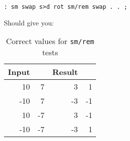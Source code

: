 \begin{lstlisting}[frame=lines]
        : sm swap s>d rot sm/rem swap . . ; 
\end{lstlisting}

\noindent Should give you: 

\begin{table}[h!]
\centering
\begin{tabular}{ | r r || r r | }
        \hline
	Input & & Result & \\
        \hline
         10 &  7 &  3 &  1\\
        -10 &  7 & -3 & -1 \\
         10 & -7 &  3 & -1\\
        -10 & -7 & -3 &  1\\
        \hline
\end{tabular}
        \caption{Correct values for \texttt{sm/rem} tests}
        \label{table_smrem}
\end{table}

